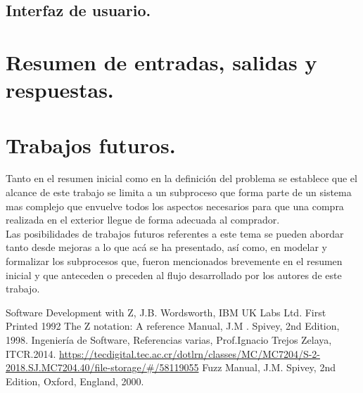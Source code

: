\documentclass[12pt,a4paper]{article}
\begin{document}

\subsection{Interfaz de usuario.}

\section{Resumen de entradas, salidas y respuestas.}

\section{Trabajos futuros.}
Tanto en el resumen inicial como en la definición del problema se establece que el alcance de este trabajo se limita a un subproceso que forma parte de un sistema mas complejo que envuelve todos los aspectos necesarios para que una compra realizada en el exterior llegue de forma adecuada al comprador.\\[\baselineskip]
\indent Las posibilidades de trabajos futuros referentes a este tema se pueden abordar tanto desde mejoras a lo que acá se ha presentado, así como, en modelar y formalizar los subprocesos que, fueron mencionados brevemente en el resumen inicial y que anteceden o preceden al flujo desarrollado por los autores de este trabajo.


\newpage
\begin{thebibliography}{00}
 Software Development with Z, J.B. Wordsworth, IBM UK Labs Ltd. First Printed 1992
 The Z notation: A reference Manual, J.M . Spivey, 2nd Edition, 1998.
 Ingeniería de Software, Referencias varias, Prof.Ignacio Trejos Zelaya, ITCR.2014. \url{https://tecdigital.tec.ac.cr/dotlrn/classes/MC/MC7204/S-2-2018.SJ.MC7204.40/file-storage/#/58119055}
 Fuzz Manual, J.M. Spivey, 2nd Edition, Oxford, England, 2000.
\end{thebibliography}
\end{document}
